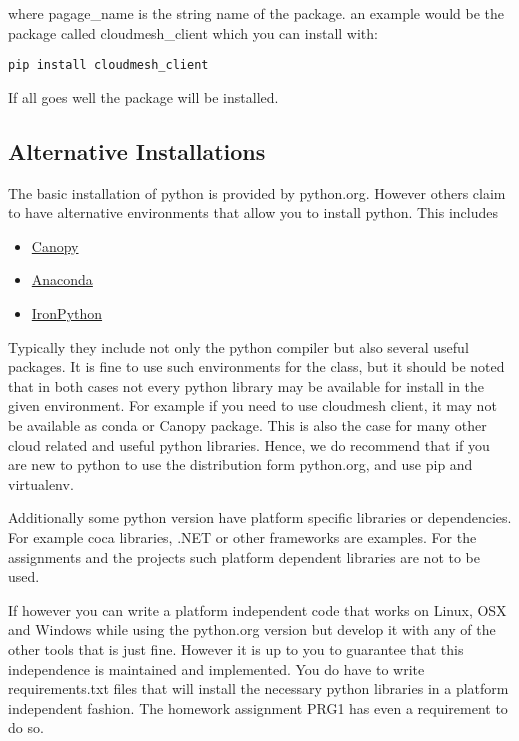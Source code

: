 where pagage\_name is the string name of the package. an example would
be the package called cloudmesh\_client which you can install with:

\begin{verbatim}
pip install cloudmesh_client
\end{verbatim}

If all goes well the package will be installed.

\subsection{Alternative Installations}\label{alternative-installations}

The basic installation of python is provided by python.org. However
others claim to have alternative environments that allow you to install
python. This includes

\begin{itemize}

\item
  \href{https://store.enthought.com/downloads/\#default}{Canopy}
\item
  \href{https://www.continuum.io/downloads}{Anaconda}
\item
  \href{http://ironpython.net/}{IronPython}
\end{itemize}

Typically they include not only the python compiler but also several
useful packages. It is fine to use such environments for the class, but
it should be noted that in both cases not every python library may be
available for install in the given environment. For example if you need
to use cloudmesh client, it may not be available as conda or Canopy
package. This is also the case for many other cloud related and useful
python libraries. Hence, we do recommend that if you are new to python
to use the distribution form python.org, and use pip and virtualenv.

Additionally some python version have platform specific libraries or
dependencies. For example coca libraries, .NET or other frameworks are
examples. For the assignments and the projects such platform dependent
libraries are not to be used.

If however you can write a platform independent code that works on
Linux, OSX and Windows while using the python.org version but develop it
with any of the other tools that is just fine. However it is up to you
to guarantee that this independence is maintained and implemented. You
do have to write requirements.txt files that will install the necessary
python libraries in a platform independent fashion. The homework
assignment PRG1 has even a requirement to do so.

